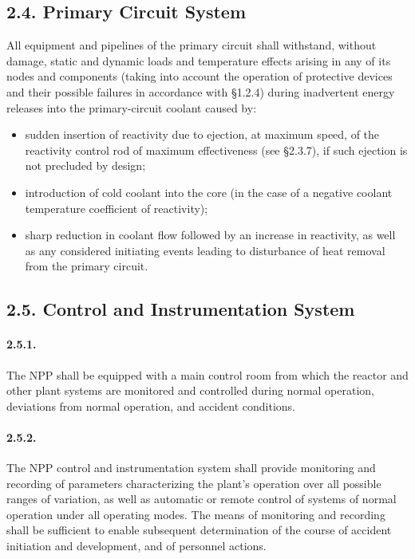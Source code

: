 \documentclass[openright]{bookest}
\begin{document}
\subsection*{2.4. Primary Circuit System}

All equipment and pipelines of the primary circuit shall withstand, without damage, static and dynamic loads and temperature effects arising in any of its nodes and components (taking into account the operation of protective devices and their possible failures in accordance with §1.2.4) during inadvertent energy releases into the primary-circuit coolant caused by:
\begin{itemize}
    \item sudden insertion of reactivity due to ejection, at maximum speed, of the reactivity control rod of maximum effectiveness (see §2.3.7), if such ejection is not precluded by design;
    \item introduction of cold coolant into the core (in the case of a negative coolant temperature coefficient of reactivity);
    \item sharp reduction in coolant flow followed by an increase in reactivity, as well as any considered initiating events leading to disturbance of heat removal from the primary circuit.
\end{itemize}

\subsection*{2.5. Control and Instrumentation System}

\paragraph{2.5.1.}
The NPP shall be equipped with a main control room from which the reactor and other plant systems are monitored and controlled during normal operation, deviations from normal operation, and accident conditions.

\paragraph{2.5.2.}
The NPP control and instrumentation system shall provide monitoring and recording of parameters characterizing the plant's operation over all possible ranges of variation, as well as automatic or remote control of systems of normal operation under all operating modes.  
The means of monitoring and recording shall be sufficient to enable subsequent determination of the course of accident initiation and development, and of personnel actions.
\end{document}
